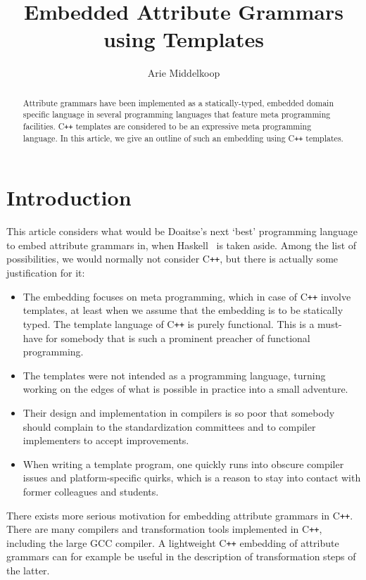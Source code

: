 \documentclass{llncs}
\title{Embedded Attribute Grammars using \Cpp{} Templates}
\author{Arie Middelkoop}
\institute{\email{amiddelk@gmail.com}}
\newcommand*{\Cpp}{C\texttt{++}}
\begin{document}
  \maketitle

  \begin{abstract}
  Attribute grammars have been implemented as a statically-typed,
  embedded domain specific language
  in several programming languages that feature meta programming facilities.
  \Cpp{} templates are considered to be an expressive meta programming language.
  In this article, we give an outline of such an embedding using \Cpp{} templates.
  \end{abstract}
 
\section{Introduction}
\label{sec:introduction}

  This article considers what would be Doaitse's next `best' programming language 
  to embed attribute grammars in, when Haskell~\cite{DBLP:conf/sblp/VieraS12} is taken aside.
  Among the list of possibilities, we would normally not consider \Cpp, but
  there is actually some justification for it:
  \begin{itemize}
  \item The embedding focuses on meta programming, which in case of
    \Cpp{} involve templates, at least when we assume that the embedding
    is to be statically typed.
    The template language of \Cpp{} is purely functional. This is a must-have for
    somebody that is such a prominent preacher of functional programming.
  \item The templates were not intended as a programming language, turning
    working on the edges of what is possible in practice into a small
    adventure.
  \item
    Their design and implementation in compilers is so poor that somebody
    should complain to the standardization committees and to compiler
    implementers to accept improvements.
  \item
    When writing a template program, one quickly runs into
    obscure compiler issues and platform-specific quirks, which is a
    reason to stay into contact with former colleagues and students.
  \end{itemize}
  There exists more serious motivation for embedding
  attribute grammars in \Cpp. There are many compilers
  and transformation tools implemented in \Cpp, including the
  large GCC compiler. A lightweight \Cpp{}
  embedding of attribute grammars can for example be useful in the
  description of transformation steps of the latter.
\end{document}
